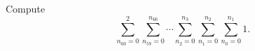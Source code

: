 Compute \[\displaystyle\sum_{n_{60}=0}^2\displaystyle\sum_{n_{59}=0}^{n_{60}}\cdots\displaystyle\sum_{n_2=0}^{n_3}\displaystyle\sum_{n_1=0}^{n_2}\displaystyle\sum_{n_0=0}^{n_1}1.\]